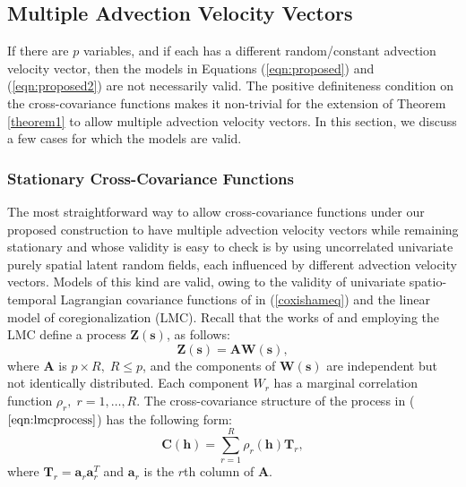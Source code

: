 \documentclass[12pt]{article}
\newcommand{\0}{\mathbf{0}}
\begin{document}

\subsection{Multiple Advection Velocity Vectors}

If there are $p$ variables, and if each has a different random/constant advection velocity vector, then the models in Equations (\ref{eqn:proposed}) and (\ref{eqn:proposed2}) are not necessarily valid. The positive definiteness condition on the cross-covariance functions makes it non-trivial for the extension of Theorem \ref{theorem1} to allow multiple advection velocity vectors.  In this section, we discuss a few cases for which the models are valid. 

\subsubsection{Stationary Cross-Covariance Functions}

The most straightforward way to allow cross-covariance functions under our proposed construction to have multiple advection velocity vectors while remaining stationary and whose validity is easy to check is by using uncorrelated univariate purely spatial latent random fields, each influenced by different advection velocity vectors. Models of this kind are valid, owing to the validity of univariate spatio-temporal Lagrangian covariance functions of \citet{cox1988} in (\ref{coxishameq}) and the linear model of coregionalization (LMC). Recall that the works of \citet{wackernagel1998} and \citet{gelfand2002multivariate} employing the LMC define a process $\mathbf{Z}(\mathbf{s})$, as follows:
\begin{equation}\label{eqn:lmcprocess}
\mathbf{Z}(\mathbf{s})=\mathbf{A}\mathbf{W}(\mathbf{s}),
\end{equation}
where $\mathbf{A}$ is $p\times R, \; R\leq p$, and the components of $\mathbf{W}(\mathbf{s})$ are independent but not identically distributed. Each component $W_r$ has a marginal correlation function $\rho_r,\;r=1,\ldots,R.$ The cross-covariance structure of the process in ($\ref{eqn:lmcprocess}$) has the following form:
\begin{equation}\label{eqn:lmc1}
\mathbf{C}(\mathbf{h})=\sum_{r=1}^{R} \rho_r(\mathbf{h}) \mathbf{T}_r,
\end{equation}
where $\mathbf{T}_r=\mathbf{a}_r \mathbf{a}_r^T$ and $\mathbf{a}_r$ is the $r$th column of $\mathbf{A}$.
\end{document}
